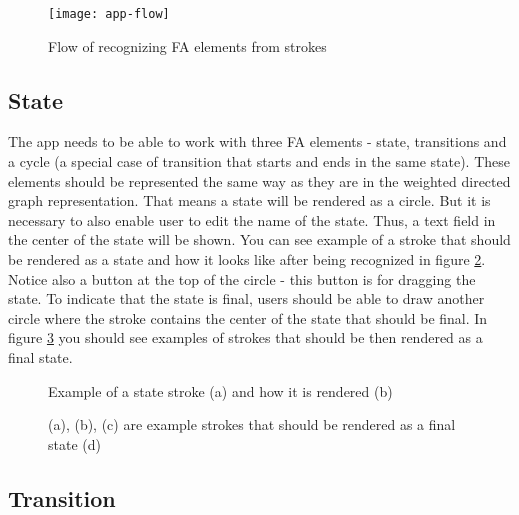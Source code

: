 \begin{figure}
    \texttt{[image: app-flow]}
    \caption{Flow of recognizing FA elements from strokes}\label{app-flow}
\end{figure}

\subsection{State}

The app needs to be able to work with three FA elements - state, transitions and a cycle (a special case of transition that starts and ends in the same state). These elements should be represented the same way as they are in the weighted directed graph representation. That means a state will be rendered as a circle. But it is necessary to also enable user to edit the name of the state. Thus, a text field in the center of the state will be shown. You can see example of a stroke that should be rendered as a state and how it looks like after being recognized in figure \ref{state}. Notice also a button at the top of the circle - this button is for dragging the state. To indicate that the state is final, users should be able to draw another circle where the stroke contains the center of the state that should be final. In figure \ref{final-state} you should see examples of strokes that should be then rendered as a final state.

\begin{figure}
    \centering
    \caption{Example of a state stroke (a) and how it is rendered (b)}\label{state}
\end{figure}

\begin{figure}
    \centering
    \caption{(a), (b), (c) are example strokes that should be rendered as a final state (d)}\label{final-state}
\end{figure}

\subsection{Transition}

